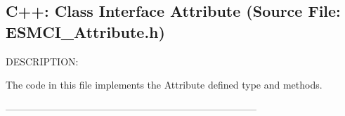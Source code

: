  
\setlength{\oldparskip}{\parskip}
\setlength{\parskip}{1.5ex}
\setlength{\oldparindent}{\parindent}
\setlength{\parindent}{0pt}
\setlength{\oldbaselineskip}{\baselineskip}
\setlength{\baselineskip}{11pt}
 
\def\bv{\begin{verbatim}}
\def\ev{\end{verbatim}}
\def\be{\begin{equation}}
\def\ee{\end{equation}}
\def\bea{\begin{eqnarray}}
\def\eea{\end{eqnarray}}
\def\bi{\begin{itemize}}
\def\ei{\end{itemize}}
\def\bn{\begin{enumerate}}
\def\en{\end{enumerate}}
\def\bd{\begin{description}}
\def\ed{\end{description}}
\def\({\left (}
\def\){\right )}
\def\[{\left [}
\def\]{\right ]}
\def\<{\left  \langle}
\def\>{\right \rangle}
\def\cI{{\cal I}}
\def\diag{\mathop{\rm diag}}
\def\tr{\mathop{\rm tr}}


 
\subsection{C++:  Class Interface Attribute (Source File: ESMCI\_Attribute.h)}


  
{\sf DESCRIPTION:\\ }


   The code in this file implements the Attribute defined type
   and methods.
  
  -----------------------------------------------------------------------------
  
